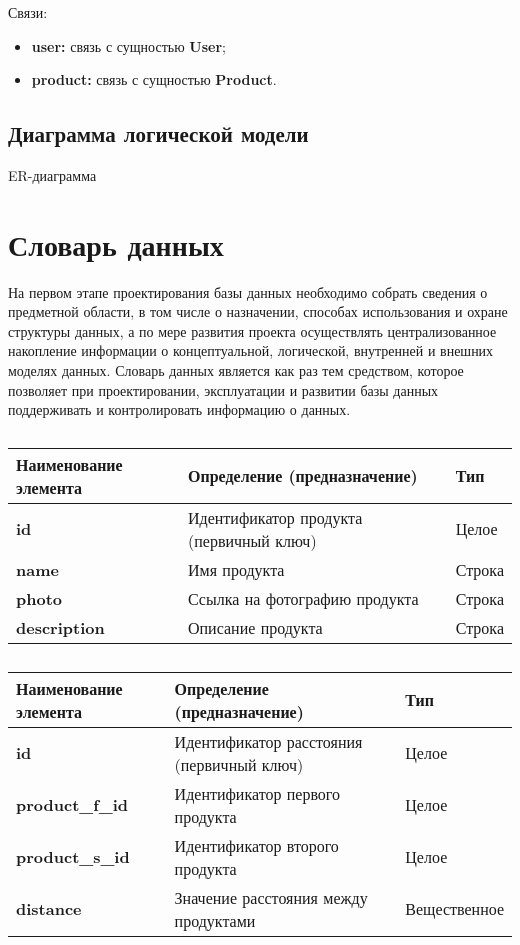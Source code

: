 Связи:
\begin{itemize}
	\item \textbf{user:} связь с сущностью \textbf{User};
	\item \textbf{product:} связь с сущностью \textbf{Product}.
\end{itemize}


\subsection{Диаграмма логической модели}

\begin{image}
	\caption{ER-диаграмма}
	\label{fig:er}
\end{image}
\section{Словарь данных}

На первом этапе проектирования базы данных необходимо собрать сведения о предметной области, в том числе о назначении, способах использования и охране структуры данных, а по мере развития проекта осуществлять централизованное накопление информации о концептуальной, логической, внутренней и внешних моделях данных. Словарь данных является как раз тем средством, которое позволяет при проектировании, эксплуатации и развитии базы данных поддерживать и контролировать информацию о данных.

\begin{longtable}{|p{3.5cm}|p{5cm}|p{5cm}|}
	\caption{} \\
	\hline
	\textbf{Наименование элемента}
	& \textbf{Определение (предназначение)}
	& \textbf{Тип} \\ \hline
	\endhead
	\textbf{id} & Идентификатор продукта (первичный ключ) & Целое \\ \hline
	\textbf{name} & Имя продукта & Строка \\ \hline
	\textbf{photo} & Ссылка на фотографию продукта & Строка \\ \hline
	\textbf{description} & Описание продукта & Строка \\ \hline
\end{longtable}

\begin{longtable}{|p{3.5cm}|p{5cm}|p{5cm}|}
	\caption{} \\
	\hline
	\textbf{Наименование элемента}
	& \textbf{Определение (предназначение)}
	& \textbf{Тип} \\ \hline
	\endhead
	\textbf{id} & Идентификатор расстояния (первичный ключ) & Целое \\ \hline
	\textbf{product\_f\_id} & Идентификатор первого продукта & Целое \\ \hline
	\textbf{product\_s\_id} & Идентификатор второго продукта & Целое \\ \hline
	\textbf{distance} & Значение расстояния между продуктами & Вещественное \\ \hline
\end{longtable}

